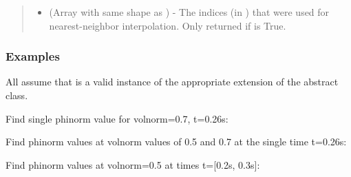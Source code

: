 \documentclass[letterpaper,10pt,english]{sphinxmanual}
\begin{document}
\begin{fulllineitems}
\begin{fulllineitems}
\begin{quote}
\begin{description}
\begin{itemize}
\item {} 
 (Array with same shape as ) - The indices
(in ) that were used for
nearest-neighbor interpolation. Only returned if  is
True.

\end{itemize}


\end{description}\end{quote}
\subsubsection*{Examples}

All assume that  is a valid instance of the appropriate
extension of the {\hyperref[\detokenize{eqtools:eqtools.core.Equilibrium}]{}} abstract class.

Find single phinorm value for volnorm=0.7, t=0.26s:

\begin{sphinxVerbatim}[commandchars=\\\{\}]
   
\end{sphinxVerbatim}

Find phinorm values at volnorm values of 0.5 and 0.7 at the single time
t=0.26s:

\begin{sphinxVerbatim}[commandchars=\\\{\}]
  \PYG{p}{[} \PYG{p}{]} 
\end{sphinxVerbatim}

Find phinorm values at volnorm=0.5 at times t={[}0.2s, 0.3s{]}:

\begin{sphinxVerbatim}[commandchars=\\\{\}]
   \PYG{p}{[} \PYG{p}{]}
\end{sphinxVerbatim}


\end{fulllineitems}
\end{fulllineitems}
\end{document}
